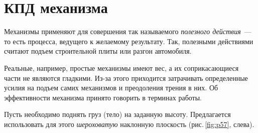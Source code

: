 \documentclass[main.tex]{subfiles}
\begin{document}

 

 

 
   

\section{КПД механизма}

Механизмы применяют для совершения так называемого \emph{полезного действия}~--- то есть процесса, ведущего к желаемому результату. Так, полезными действиями считают подъем строительной плиты или разгон автомобиля. 

Реальные, например, простые механизмы имеют вес, а их соприкасающиеся части не являются гладкими. Из-за этого приходится затрачивать определенные усилия на подъем самих механизмов и преодоления трения в них. Об эффективности механизма принято говорить в терминах работы.

Пусть необходимо поднять груз (тело) на заданную высоту. Предлагается использовать для этого \emph{шероховатую} наклонную плоскость (рис.\,\ref{fig:p57}, слева).
\end{document}
